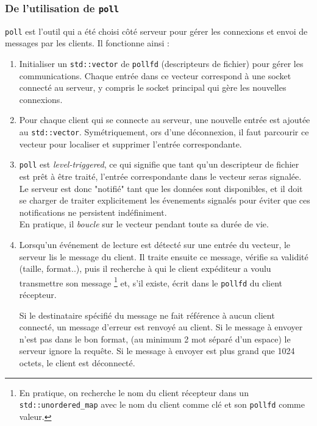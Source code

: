 \documentclass{article}
\begin{document}
\subsubsection{De l'utilisation de \texttt{poll}}
\texttt{poll} \cite{poll} est l'outil qui a été choisi côté serveur pour gérer les connexions et envoi de messages par les clients. Il fonctionne ainsi \cite{poll} : 
\begin{enumerate}
    \item Initialiser un \texttt{std::vector} de \texttt{pollfd} (descripteurs de fichier) pour gérer les communications. Chaque entrée dans ce vecteur correspond à une socket connecté au serveur, y compris le socket principal qui gère les nouvelles connexions.
    \item Pour chaque client qui se connecte au serveur, une nouvelle entrée  est ajoutée au \texttt{std::vector}. Symétriquement, ors d'une déconnexion, il faut parcourir ce vecteur pour localiser et supprimer l'entrée correspondante.
    \item \texttt{poll} est \textit{level-triggered}, ce qui signifie que tant qu'un descripteur de fichier est prêt à être traité, l'entrée correspondante dans le vecteur seras signalée. Le serveur est donc "notifié" tant que les données sont disponibles, \cite{LevelEdgeTrigger} \cite{PollTrigger} et il doit se charger de traiter explicitement les évenements signalés pour éviter que ces notifications ne persistent indéfiniment.\\ En pratique, il \textit{boucle} sur le vecteur pendant toute sa durée de vie. 
    \item Lorsqu’un événement de lecture est détecté sur une entrée du vecteur, le serveur lis le message du client. Il traite ensuite ce message, vérifie sa validité (taille, format..), puis il recherche à qui le client expéditeur a voulu transmettre son message \footnote{En pratique, on recherche le nom du client récepteur dans un \texttt{std::unordered\_map} avec le nom du client comme clé et son \texttt{pollfd} comme valeur.} et, s'il existe, écrit dans le \texttt{pollfd} du client récepteur.


    Si le destinataire spécifié du message ne fait référence à aucun client connecté, un message d'erreur est renvoyé au client.
    Si le message à envoyer n'est pas dans le bon format, (au minimum 2 mot séparé d'un espace) le serveur ignore la requête.
    Si le message à envoyer est plus grand que 1024 octets, le client est déconnecté.
\end{enumerate}
\end{document}
